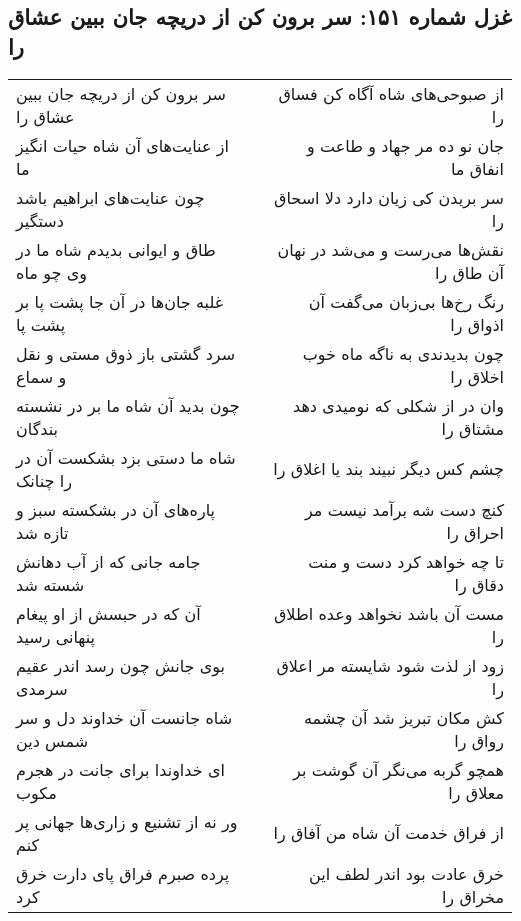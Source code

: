 \begin{center}
\section*{غزل شماره ۱۵۱: سر برون کن از دریچه جان ببین عشاق را}
\label{sec:0151}
\begin{longtable}{l p{0.5cm} r}
سر برون کن از دریچه جان ببین عشاق را
&&
از صبوحی‌های شاه آگاه کن فساق را
\\
از عنایت‌های آن شاه حیات انگیز ما
&&
جان نو ده مر جهاد و طاعت و انفاق ما
\\
چون عنایت‌های ابراهیم باشد دستگیر
&&
سر بریدن کی زیان دارد دلا اسحاق را
\\
طاق و ایوانی بدیدم شاه ما در وی چو ماه
&&
نقش‌ها می‌رست و می‌شد در نهان آن طاق را
\\
غلبه جان‌ها در آن جا پشت پا بر پشت پا
&&
رنگ رخ‌ها بی‌زبان می‌گفت آن اذواق را
\\
سرد گشتی باز ذوق مستی و نقل و سماع
&&
چون بدیدندی به ناگه ماه خوب اخلاق را
\\
چون بدید آن شاه ما بر در نشسته بندگان
&&
وان در از شکلی که نومیدی دهد مشتاق را
\\
شاه ما دستی بزد بشکست آن در را چنانک
&&
چشم کس دیگر نبیند بند یا اغلاق را
\\
پاره‌های آن در بشکسته سبز و تازه شد
&&
کنچ دست شه برآمد نیست مر احراق را
\\
جامه جانی که از آب دهانش شسته شد
&&
تا چه خواهد کرد دست و منت دقاق را
\\
آن که در حبسش از او پیغام پنهانی رسید
&&
مست آن باشد نخواهد وعده اطلاق را
\\
بوی جانش چون رسد اندر عقیم سرمدی
&&
زود از لذت شود شایسته مر اعلاق را
\\
شاه جانست آن خداوند دل و سر شمس دین
&&
کش مکان تبریز شد آن چشمه رواق را
\\
ای خداوندا برای جانت در هجرم مکوب
&&
همچو گربه می‌نگر آن گوشت بر معلاق را
\\
ور نه از تشنیع و زاری‌ها جهانی پر کنم
&&
از فراق خدمت آن شاه من آفاق را
\\
پرده صبرم فراق پای دارت خرق کرد
&&
خرق عادت بود اندر لطف این مخراق را
\\
\end{longtable}
\end{center}
